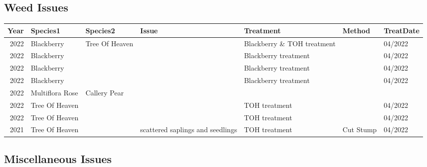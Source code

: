 \documentclass[
  landscape]{article}
\begin{document}
\hypertarget{weed-issues}{%
\subsection{Weed Issues}\label{weed-issues}}

\begin{tabular}{r|l|l|l|l|l|l}
\hline
Year & Species1 & Species2 & Issue & Treatment & Method & TreatDate\\
\hline
2022 & Blackberry & Tree Of Heaven &  & Blackberry \& TOH treatment &  & 04/2022\\
\hline
2022 & Blackberry &  &  & Blackberry treatment &  & 04/2022\\
\hline
2022 & Blackberry &  &  & Blackberry treatment &  & 04/2022\\
\hline
2022 & Blackberry &  &  & Blackberry treatment &  & 04/2022\\
\hline
2022 & Multiflora Rose & Callery Pear &  &  &  & \\
\hline
2022 & Tree Of Heaven &  &  & TOH treatment &  & 04/2022\\
\hline
2022 & Tree Of Heaven &  &  & TOH treatment &  & 04/2022\\
\hline
2021 & Tree Of Heaven &  & scattered saplings and seedlings & TOH treatment & Cut Stump & 04/2022\\
\hline
\end{tabular}

\hypertarget{miscellaneous-issues}{%
\subsection{Miscellaneous Issues}\label{miscellaneous-issues}}

\begin{tabular}{}
\hline

\hline
\end{tabular}
\end{document}
